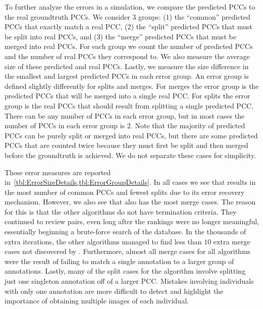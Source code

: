     To further analyze the errors in a simulation, we compare the predicted PCCs to the real groundtruth PCCs.
    We consider $3$ groups:
    (1) the ``common'' predicted PCCs that exactly match a real PCC,
    (2) the ``split'' predicted PCCs that must be split into real PCCs, and
    (3) the ``merge'' predicted PCCs that must be merged into real PCCs.
    For each group we count the number of predicted PCCs and the number of real PCCs they correspond to.
    We also measure the average size of these predicted and real PCCs.
    Lastly, we measure the size difference in the smallest and largest predicted PCCs in each error group.
    An error group is defined slightly differently for splits and merges.
    For merges the error group is the predicted PCCs that will be merged into a single real PCC.
    For splits the error group is the real PCCs that should result from splitting a single predicted PCC.
    There can be any number of PCCs in each error group, but in most cases the number of PCCs in each error group
      is $2$.
    Note that the majority of predicted PCCs can be purely split or merged into real PCCs, but there are some
      predicted PCCs that are counted twice because they must first be split and then merged before the
      groundtruth is achieved.
    We do not separate these cases for simplicity.

    These error measures are reported in~\cref{tbl:ErrorSizeDetails,tbl:ErrorGroupDetails}.
    In all cases we see that  results in the most number of common PCCs and fewest splits due to its
      error recovery mechanism.
    However, we also see that  also has the most merge cases.
    The reason for this is that the other algorithms do not have termination criteria.
    They continued to review pairs, even long after the rankings were no longer meaningful, essentially beginning
      a brute-force search of the database.
    In the thousands of extra iterations, the other algorithms managed to find less than $10$ extra merge cases
      not discovered by .
    Furthermore, almost all merge cases for all algorithms were the result of failing to match a single
      annotation to a larger group of annotations.
    Lastly, many of the split cases for the  algorithm involve splitting just one singleton
      annotation off of a larger PCC.
    Mistakes involving individuals with only one annotation are more difficult to detect and highlight the
      importance of obtaining multiple images of each individual.


